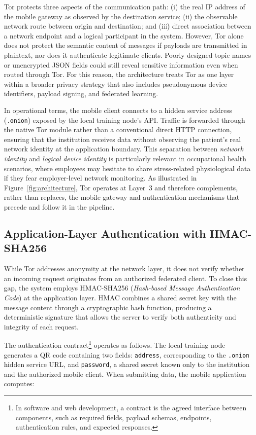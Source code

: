 \documentclass[12pt]{article}
\begin{document}
Tor protects three aspects of the communication path: (i) the real IP address of the mobile gateway as observed by the destination service; (ii) the observable network route between origin and destination; and (iii) direct association between a network endpoint and a logical participant in the system. However, Tor alone does not protect the semantic content of messages if payloads are transmitted in plaintext, nor does it authenticate legitimate clients. Poorly designed topic names or unencrypted JSON fields could still reveal sensitive information even when routed through Tor. For this reason, the architecture treats Tor as one layer within a broader privacy strategy that also includes pseudonymous device identifiers, payload signing, and federated learning.

In operational terms, the mobile client connects to a hidden service address (\texttt{.onion}) exposed by the local training node's API. Traffic is forwarded through the native Tor module rather than a conventional direct HTTP connection, ensuring that the institution receives data without observing the patient's real network identity at the application boundary. This separation between \textit{network identity} and \textit{logical device identity} is particularly relevant in occupational health scenarios, where employees may hesitate to share stress-related physiological data if they fear employer-level network monitoring. As illustrated in Figure~\ref{fig:architecture}, Tor operates at Layer~3 and therefore complements, rather than replaces, the mobile gateway and authentication mechanisms that precede and follow it in the pipeline.

\subsection{Application-Layer Authentication with HMAC-SHA256}

While Tor addresses anonymity at the network layer, it does not verify whether an incoming request originates from an authorized federated client. To close this gap, the system employs HMAC-SHA256 \cite{rfc2104} (\textit{Hash-based Message Authentication Code}) at the application layer. HMAC combines a shared secret key with the message content through a cryptographic hash function, producing a deterministic signature that allows the server to verify both authenticity and integrity of each request.

The authentication contract\footnote{In software and web development, a contract is the agreed interface between components, such as required fields, payload schemas, endpoints, authentication rules, and expected responses.} operates as follows. The local training node generates a QR code containing two fields: \texttt{address}, corresponding to the \texttt{.onion} hidden service URL, and \texttt{password}, a shared secret known only to the institution and the authorized mobile client. When submitting data, the mobile application computes:
\end{document}
